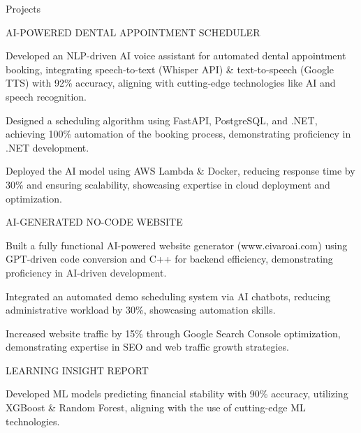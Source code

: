 \documentclass{resume} %
\begin{document}
    \begin{rSection}{Projects}
                    \begin{rSubsection}
                                    {AI{-}POWERED DENTAL APPOINTMENT SCHEDULER}
                                {}{}{}
                                    \item Developed an NLP{-}driven AI voice assistant for automated dental appointment booking, integrating speech{-}to{-}text (Whisper API) \& text{-}to{-}speech (Google TTS) with 92\% accuracy, aligning with cutting{-}edge technologies like AI and speech recognition.
                                    \item Designed a scheduling algorithm using FastAPI, PostgreSQL, and .NET, achieving 100\% automation of the booking process, demonstrating proficiency in .NET development.
                                    \item Deployed the AI model using AWS Lambda \& Docker, reducing response time by 30\% and ensuring scalability, showcasing expertise in cloud deployment and optimization.
                            \end{rSubsection}
                    \begin{rSubsection}
                                    {AI{-}GENERATED NO{-}CODE WEBSITE}
                                {}{}{}
                                    \item Built a fully functional AI{-}powered website generator (www.civaroai.com) using GPT{-}driven code conversion and C++ for backend efficiency, demonstrating proficiency in AI{-}driven development.
                                    \item Integrated an automated demo scheduling system via AI chatbots, reducing administrative workload by 30\%, showcasing automation skills.
                                    \item Increased website traffic by 15\% through Google Search Console optimization, demonstrating expertise in SEO and web traffic growth strategies.
                            \end{rSubsection}
                    \begin{rSubsection}
                                    {LEARNING INSIGHT REPORT}
                                {}{}{}
                                    \item Developed ML models predicting financial stability with 90\% accuracy, utilizing XGBoost \& Random Forest, aligning with the use of cutting{-}edge ML technologies.

\end{rSubsection}
\end{rSection}
\end{document}
